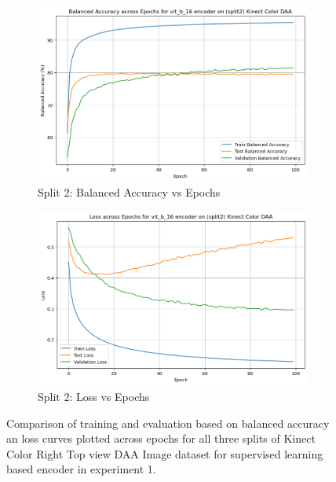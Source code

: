 \begin{figure}[htbp]
    \begin{subfigure}[b]{0.45\textwidth}
        \includegraphics[width=\textwidth]{Images_Thesis/Tensboard_runs_images_all/Experiment_00_Sup_D_A_no_Aug/Split_2/output_bal_acc_split_2_d_a_no_aug.png}
        \caption{Split 2: Balanced Accuracy vs Epochs}
        \label{fig:Exp_1_05}
    \end{subfigure}
    \hfill
    \begin{subfigure}[b]{0.45\textwidth}
        \includegraphics[width=\textwidth]{Images_Thesis/Tensboard_runs_images_all/Experiment_00_Sup_D_A_no_Aug/Split_2/output_loss_split_2_d_a_no_aug.png}
        \caption{Split 2: Loss vs Epochs}
        \label{fig:Exp_1_06}
    \end{subfigure}
    \caption[Results of Experiment 1: Supervised Learning Based Encoder]{Comparison of training and evaluation based on balanced accuracy an loss curves plotted across epochs for all three splits of Kinect Color Right Top view DAA Image dataset for supervised learning based encoder in experiment 1.}
    \label{fig:Exp_1_00}
\end{figure}

